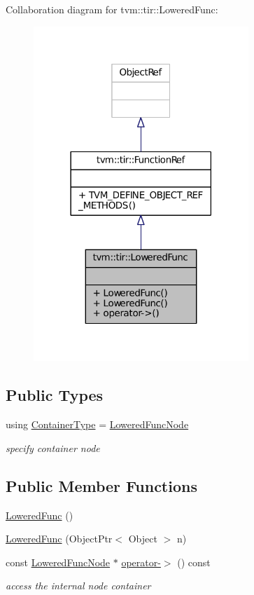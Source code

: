 Collaboration diagram for tvm\+:\+:tir\+:\+:Lowered\+Func\+:
\nopagebreak
\begin{figure}[H]
\begin{center}
\leavevmode
\includegraphics[width=230pt]{classtvm_1_1tir_1_1LoweredFunc__coll__graph}
\end{center}
\end{figure}
\subsection*{Public Types}
\begin{DoxyCompactItemize}
\item 
using \hyperlink{classtvm_1_1tir_1_1LoweredFunc_a6a4362c881720560c1fc4369c8b7c2e8}{Container\+Type} = \hyperlink{classtvm_1_1tir_1_1LoweredFuncNode}{Lowered\+Func\+Node}
\begin{DoxyCompactList}\small\item\em specify container node \end{DoxyCompactList}\end{DoxyCompactItemize}
\subsection*{Public Member Functions}
\begin{DoxyCompactItemize}
\item 
\hyperlink{classtvm_1_1tir_1_1LoweredFunc_a12a1aae74cf8418a2126b542b7c9e902}{Lowered\+Func} ()
\item 
\hyperlink{classtvm_1_1tir_1_1LoweredFunc_a22bdc793811e5ecea8fae57ed8e7bf1d}{Lowered\+Func} (Object\+Ptr$<$ Object $>$ n)
\item 
const \hyperlink{classtvm_1_1tir_1_1LoweredFuncNode}{Lowered\+Func\+Node} $\ast$ \hyperlink{classtvm_1_1tir_1_1LoweredFunc_a06354fe4b44c911928b49f52d52858d3}{operator-\/$>$} () const 
\begin{DoxyCompactList}\small\item\em access the internal node container \end{DoxyCompactList}\end{DoxyCompactItemize}


